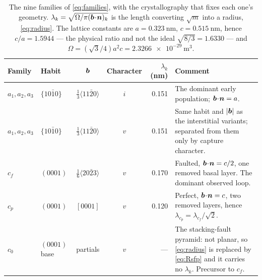 \begin{table}[htbp]
\caption{The nine families of \cref{eq:families}, with the crystallography that
fixes each one's geometry. $\lambda_k=\sqrt{\Omega/\pi(\bm{b}\!\cdot\!\bm{n})_k}$
is the length converting $\sqrt{m}$ into a radius, \cref{eq:radius}.
The lattice constants are $a=\SI{0.323}{\nano\meter}$,
$c=\SI{0.515}{\nano\meter}$, hence $c/a=1.5944$ --- the physical ratio and not
the ideal $\sqrt{8/3}=1.6330$ --- and
$\Omega=(\sqrt3/4)a^2c=\SI{2.3266e-29}{\cubic\meter}$.}
\label{tab:cd-families}
\centering\small
\begin{tabularx}{\textwidth}{@{}llccrX@{}}
\toprule
Family & Habit & $\bm{b}$ & Character & $\lambda_k$ (nm) & Comment \\
\midrule
$a_1,a_2,a_3$ & $\{10\bar10\}$ & $\tfrac13\langle11\bar20\rangle$ & $i$ &
  0.151 & The dominant early population; $\bm{b}\!\cdot\!\bm{n}=a$. \\
$a_1,a_2,a_3$ & $\{10\bar10\}$ & $\tfrac13\langle11\bar20\rangle$ & $v$ &
  0.151 & Same habit and $|\bm{b}|$ as the interstitial variants; separated from
  them only by capture character. \\
$c_f$ & $(0001)$ & $\tfrac16\langle20\bar23\rangle$ & $v$ &
  0.170 & Faulted, $\bm{b}\!\cdot\!\bm{n}=c/2$, one removed basal layer. The
  dominant observed \cloop{} loop. \\
$c_p$ & $(0001)$ & $[0001]$ & $v$ &
  0.120 & Perfect, $\bm{b}\!\cdot\!\bm{n}=c$, two removed layers, hence
  $\lambda_{c_p}=\lambda_{c_f}/\sqrt2$. \\
$c_0$ & $(0001)$ base & partials & $v$ &
  --- & The stacking-fault pyramid: not planar, so \cref{eq:radius} is replaced
  by \cref{eq:Rsfp} and it carries no $\lambda_k$. Precursor to $c_f$. \\
\bottomrule
\end{tabularx}
\end{table}

